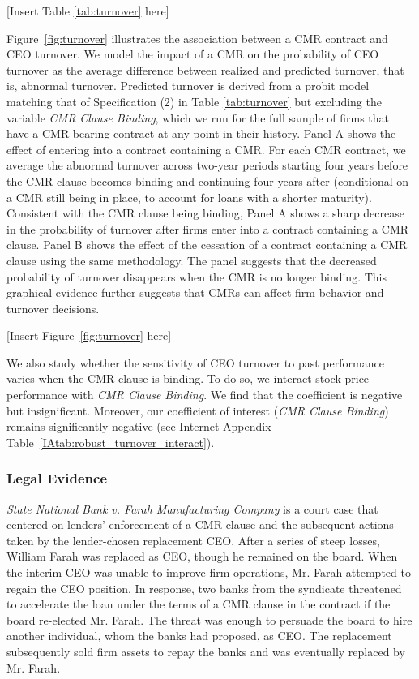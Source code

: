 \documentclass[a4paper,12pt]{article}
\begin{document}
\begin{center}
  [Insert Table \ref{tab:turnover} here]
\end{center}


Figure~\ref{fig:turnover} illustrates the association between a CMR contract and CEO turnover.
We model the impact of a CMR on the probability of CEO turnover as the average difference between realized and predicted turnover, that is, abnormal turnover.
Predicted turnover is derived from a probit model matching that of Specification (2) in Table \ref{tab:turnover} but excluding the variable \textit{CMR Clause Binding}, which we run for the full sample of firms that have a CMR-bearing contract at any point in their history.
Panel A shows the effect of entering into a contract containing a CMR.
For each CMR contract, we average the abnormal turnover across two-year periods starting four years before the CMR clause becomes binding and continuing four years after (conditional on a CMR still being in place, to account for loans with a shorter maturity).
Consistent with the CMR clause being binding, Panel A shows a sharp decrease in the probability of turnover after firms enter into a contract containing a CMR clause.
Panel B shows the effect of the cessation of a contract containing a CMR clause using the same methodology.
The panel suggests that the decreased probability of turnover disappears when the CMR is no longer binding.
This graphical evidence further suggests that CMRs can affect firm behavior and turnover decisions.


\begin{center}
  [Insert Figure~\ref{fig:turnover} here]
\end{center}

We also study whether the sensitivity of CEO turnover to past performance varies when the CMR clause is binding.
To do so, we interact stock price performance with \textit{CMR Clause Binding}.
We find that the coefficient is negative but insignificant.
Moreover, our coefficient of interest (\textit{CMR Clause Binding}) remains significantly negative (see Internet Appendix Table~\ref{IAtab:robust_turnover_interact}).


\subsubsection{Legal Evidence} \label{section:farah_case}

\textit{State National Bank v. Farah Manufacturing Company} is a court case that centered on lenders' enforcement of a CMR clause and the subsequent actions taken by the lender-chosen replacement CEO.
After a series of steep losses, William Farah was replaced as CEO, though he remained on the board.
When the interim CEO was unable to improve firm operations, Mr. Farah attempted to regain the CEO position.
In response, two banks from the syndicate threatened to accelerate the loan under the terms of a CMR clause in the contract if the board re-elected Mr. Farah.
The threat was enough to persuade the board to hire another individual, whom the banks had proposed, as CEO.
The replacement subsequently sold firm assets to repay the banks and was eventually replaced by Mr. Farah.
\end{document}
